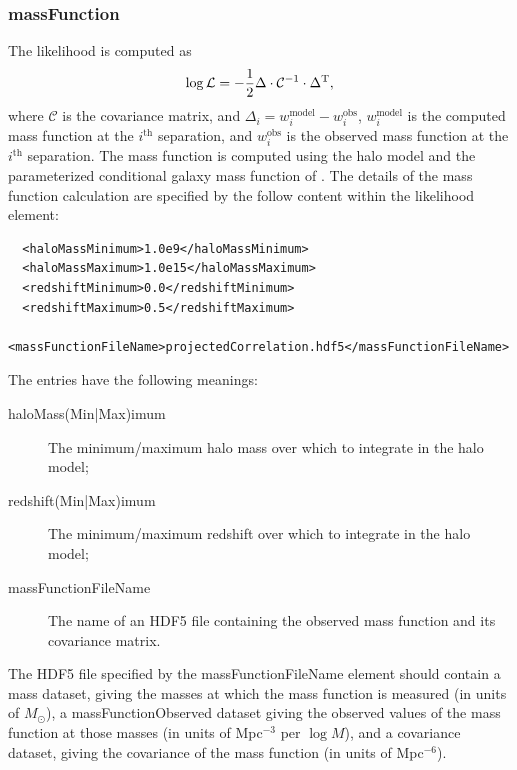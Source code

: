 \subsubsection{massFunction}

The likelihood is computed as
\begin{equation}
\log \mathcal{L} = -{1\over2} \Delta \cdot \mathcal{C}^{-1} \cdot \Delta^\mathrm{T},
\end{equation}
where $\mathcal{C}$ is the covariance matrix, and $\Delta_i = w_i^\mathrm{model} - w_i^\mathrm{obs}$, $w_i^\mathrm{model}$ is the computed mass function at the $i^\mathrm{th}$ separation, and $w_i^\mathrm{obs}$ is the observed mass function at the $i^\mathrm{th}$ separation. The mass function is computed using the halo model and the parameterized conditional galaxy mass function of \cite[][see also \protect\cite{leauthaud_new_2011}; \S\protect\ref{phys:conditionalMassFunction:conditionalMassFunctionBehroozi2010}]{behroozi_comprehensive_2010}. The details of the mass function calculation are specified by the follow content within the {\normalfont \ttfamily likelihood} element:
\begin{verbatim}
  <haloMassMinimum>1.0e9</haloMassMinimum>
  <haloMassMaximum>1.0e15</haloMassMaximum>
  <redshiftMinimum>0.0</redshiftMinimum>
  <redshiftMaximum>0.5</redshiftMaximum>
  <massFunctionFileName>projectedCorrelation.hdf5</massFunctionFileName>
\end{verbatim}

The entries have the following meanings:
\begin{description}
\item[{\normalfont \ttfamily haloMass(Min|Max)imum}] The minimum/maximum halo mass over which to integrate in the halo model;
\item[{\normalfont \ttfamily redshift(Min|Max)imum}] The minimum/maximum redshift over which to integrate in the halo model;
\item[{\normalfont \ttfamily massFunctionFileName}] The name of an HDF5 file containing the observed mass function and its covariance matrix.
\end{description}

The HDF5 file specified by the {\normalfont \ttfamily massFunctionFileName} element should contain a {\normalfont \ttfamily mass} dataset, giving the masses at which the mass function is measured (in units of $M_\odot$), a {\normalfont \ttfamily massFunctionObserved} dataset giving the observed values of the mass function at those masses (in units of Mpc$^{-3}$ per $\log M$), and a {\normalfont \ttfamily covariance} dataset, giving the covariance of the mass function (in units of Mpc$^{-6}$).

